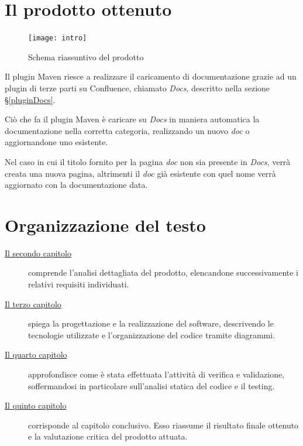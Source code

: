 \clearpage

\section{Il prodotto ottenuto}

\begin{figure}[H]
    \centering
    \texttt{[image: intro]}\\
    \caption{Schema riassuntivo del prodotto}
    \label{screenDocs}
\end{figure}

Il plugin Maven riesce a realizzare il caricamento di documentazione grazie ad un plugin di terze parti su Confluence, chiamato \emph{Docs}, descritto nella sezione \S\ref{pluginDocs}.

Ciò che fa il plugin Maven è caricare su \emph{Docs} in maniera automatica la documentazione nella corretta categoria, realizzando un nuovo \emph{doc} o aggiornandone uno esistente.

Nel caso in cui il titolo fornito per la pagina \emph{doc} non sia presente in \emph{Docs}, verrà creata una nuova pagina, altrimenti il \emph{doc} già esistente con quel nome verrà aggiornato con la documentazione data.

\section{Organizzazione del testo}

\begin{description}
    \item[{\hyperref[cap:analisi-requisiti]{Il secondo capitolo}}] comprende l'analisi dettagliata del prodotto, elencandone successivamente i relativi requisiti individuati.

    \item[{\hyperref[cap:progettazione]{Il terzo capitolo}}] spiega la progettazione e la realizzazione del software, descrivendo le tecnologie utilizzate e l'organizzazione del codice tramite diagrammi.

    \item[{\hyperref[cap:testing]{Il quarto capitolo}}] approfondisce come è stata effettuata l'attività di verifica e validazione, soffermandosi in particolare sull'analisi statica del codice e il testing.

    \item[{\hyperref[cap:conclusioni]{Il quinto capitolo}}] corrisponde al capitolo conclusivo. Esso riassume il risultato finale ottenuto e la valutazione critica del prodotto attuata.

\end{description}

